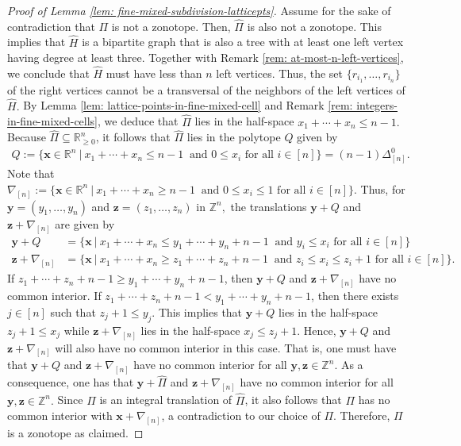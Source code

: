 \documentclass[12pt,reqno]{article}%
\theoremstyle{definition}
\numberwithin{equation}{section}
\newcommand{\bbx}{\mathbf{x}}
\newcommand{\bby}{\mathbf{y}}
\newcommand{\bbz}{\mathbf{z}}
\newcommand{\Z}{\mathbb Z}
\newcommand{\R}{\mathbb R}
\newcommand{\sym}{\Delta^0}
\begin{document}
\begin{proof}[Proof of Lemma \ref{lem: fine-mixed-subdivision-latticepts}]
    Assume for the sake of contradiction that $\Pi$ is not a zonotope. Then, $\hat{\Pi}$ is also not a zonotope. This implies that $\hat{H}$ is a bipartite graph that is also a tree with at least one left vertex having degree at least three. Together with Remark \ref{rem: at-most-n-left-vertices}, we conclude that $\hat{H}$ must have less than $n$ left vertices. Thus, the set $\{r_{i_1},\dots, r_{i_n}\}$ of the right vertices cannot be a transversal of the neighbors of the left vertices of $\hat{H}.$ By Lemma \ref{lem: lattice-points-in-fine-mixed-cell} and Remark \ref{rem: integers-in-fine-mixed-cells}, we deduce that $\hat{\Pi}$ lies in the half-space $x_1 + \cdots + x_n \leq n-1.$ Because $\hat{\Pi} \subseteq \R^n_{\geq 0}$, it follows that $\hat{\Pi}$ lies in the polytope $Q$ given by
\begin{align*}
    Q:= \{\bbx \in \R^n\ | \ x_1 + \cdots + x_n \leq n-1 \ \text{ and } 0 \leq x_i \text{ for all } i \in [n]\} = (n-1)\sym_{[n]}.
\end{align*}
Note that $\nabla_{[n]}:= \{\bbx  \in \R^n \ | \ x_1 + \cdots + x_n \geq n-1 \ \text{ and } 0 \leq x_i \leq 1 \text{ for all } i \in [n]\}.$ Thus, for $\bby = (y_1, \dots, y_n)$ and $\bbz = (z_1, \dots, z_n)$ in $\Z^n,$ the translations $\bby + Q$ and $\bbz+ \nabla_{[n]}$ are given by
\begin{align*}
    \bby + Q&= \{\bbx\ | \ x_1 + \cdots + x_n \leq y_1 + \cdots + y_n + n-1 \ \text{ and } y_i \leq x_i \text{ for all } i \in [n]\}\\
    \bbz+ \nabla_{[n]}&= \{\bbx\ | \ x_1 + \cdots + x_n \geq z_1 + \cdots + z_n + n-1 \ \text{ and } z_i \leq x_i \leq z_i + 1 \text{ for all } i \in [n]\}.
\end{align*}
If $z_1 + \cdots + z_n + n-1 \geq y_1 + \cdots + y_n + n-1$, then $\bby + Q$ and $\bbz + \nabla_{[n]}$ have no common interior. If $z_1 + \cdots + z_n + n-1 < y_1 + \cdots + y_n + n-1$, then there exists $j \in [n]$ such that $z_j + 1 \leq y_j.$ This implies that $\bby + Q$ lies in the half-space $z_j + 1 \leq x_j$ while $\bbz + \nabla_{[n]}$ lies in the half-space $x_j \leq z_j + 1.$ Hence, $\bby+ Q$ and $\bbz + \nabla_{[n]}$ will also have no common interior in this case. That is, one must have that $\bby+ Q$ and $\bbz + \nabla_{[n]}$ have no common interior for all $\bby, \bbz \in \Z^n.$ As a consequence, one has that $\bby + \hat{\Pi}$ and $\bbz + \nabla_{[n]}$ have no common interior for all $\bby, \bbz \in \Z^n.$ Since $\Pi$ is an integral translation of $\hat{\Pi}$, it also follows that $\Pi$ has no common interior with $\bbx + \nabla_{[n]}$, a contradiction to our choice of $\Pi$. Therefore, $\Pi$ is a zonotope as claimed. 


\end{proof}
\end{document}
